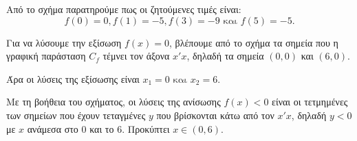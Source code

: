 
\begin{alist}
\item Από το σχήμα παρατηρούμε πως οι ζητούμενες τιμές είναι:
\[f(0) = 0, f(1) = -5, f(3) = -9 \text{ και } f(5) = -5.\]

\item Για να λύσουμε την εξίσωση $f(x) = 0$, βλέπουμε από το σχήμα τα σημεία που η γραφική
παράσταση $C_f$ τέμνει τον άξονα $x'x$, δηλαδή τα σημεία $(0, 0)$ και $(6, 0)$.

Άρα οι λύσεις της εξίσωσης είναι $x_1 = 0 \text{ και } x_2 = 6$.

\item Με τη βοήθεια του σχήματος, οι λύσεις της ανίσωσης $f(x) < 0$ είναι οι τετμημένες των
σημείων που έχουν τεταγμένες $y$ που βρίσκονται κάτω από τον $x'x$, δηλαδή $y < 0$ με $x$
ανάμεσα στο $0$ και το $6$. Προκύπτει $x \in (0, 6)$.
\end{alist}

